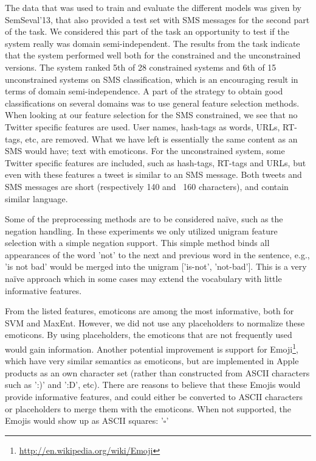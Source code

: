 The data that was used to train and evaluate the different models was given by SemSeval'13, that also provided a test set with SMS messages for the second part of the task. We considered this part of the task an opportunity to test if the system really was domain semi-independent. The results from the task indicate that the system performed well both for the constrained and the unconstrained versions. The system ranked 5th of 28 constrained systems and 6th of 15 unconstrained systems on SMS classification, which is an encouraging result in terms of domain semi-independence. A part of the strategy to obtain good classifications on several domains was to use general feature selection methods. When looking at our feature selection for the SMS constrained, we see that no Twitter specific features are used. User names, hash-tags as words, URLs, RT-tags, etc, are removed. What we have left is essentially the same content as an SMS would have; text with emoticons. For the unconstrained system, some Twitter specific features are included, such as hash-tags, RT-tags and URLs, but even with these features a tweet is similar to an SMS message. Both tweets and SMS messages are short (respectively 140 and ~160 characters), and contain similar language. 

Some of the preprocessing methods are to be considered na\"{i}ve, such as the negation handling. In these experiments we only utilized unigram feature selection with a simple negation support. This simple method binds all appearances of the word 'not' to the next and previous word in the sentence, e.g., 'is not bad' would be merged into the unigram ['is-not', 'not-bad']. This is a very na\"{i}ve approach which in some cases may extend the vocabulary with little informative features.

From the listed features, emoticons are among the most informative, both for SVM and MaxEnt. However, we did not use any placeholders to normalize these emoticons. By using placeholders, the emoticons that are not frequently used would gain information. Another potential improvement is support for Emoji\footnote{\url{http://en.wikipedia.org/wiki/Emoji}}, which have very similar semantics as emoticons, but are implemented in Apple products as an own character set (rather than constructed from ASCII characters such as ':)' and ':D', etc). There are reasons to believe that these Emojis would provide informative features, and could either be converted to ASCII characters or placeholders to merge them with the emoticons. When not supported, the Emojis would show up as ASCII squares: '$\square$'

